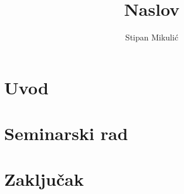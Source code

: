 \documentclass[times, utf8, seminar]{fer}
\begin{document}
\title{Naslov}

\author{Stipan Mikulić}

\maketitle

\tableofcontents

\chapter{Uvod}


\newpage

\chapter{Seminarski rad}

\chapter{Zaključak}





\nocite{*}

\begin{sazetak}


\kljucnerijeci{}
\end{sazetak}
\begin{abstract}


\keywords{}
\end{abstract}
\end{document}
